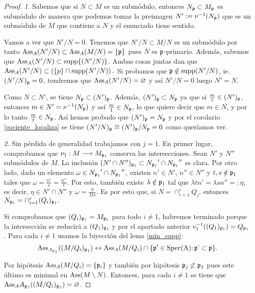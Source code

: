 \documentclass[../main.tex]{subfiles}
\begin{document}
\begin{proof}
\textit{1.} Sabemos que si $N\subset M$ es un submódulo, entonces $N_{\mathfrak{p}}\subset M_{\mathfrak{p}}$ es submódulo de manera que podemos tomar la preimagen $N':=\nu^{-1}(N_{\mathfrak{p}})$ que es un submódulo de $M$ que contiene a $N$ y el enunciado tiene sentido.

Vamos a ver que $N'/N = 0$. Tenemos que $N'/N\subset M/N$ es un submódulo por tanto $\text{Ass}_A(N'/N)\subset\text{Ass}_A(M/N)=\{\mathfrak{p}\}$ pues $N$ es $\mathfrak{p}$-primario. Además, sabemos que $\text{Ass}_A(N'/N)\subset\operatorname{supp}\{(N'/N)\}$.
Ambas cosas juntas dan que $\text{Ass}_A(N'/N) \subset \left ( \{p\}\cap\operatorname{supp}(N'/N) \right).$ Si probamos que $\mathfrak{p}\notin\operatorname{supp}(N'/N)$, ie. $(N'/N)_{\mathfrak{p}} = 0$, tendremos que $\text{Ass}_A(N'/N)=\varnothing$ y así $N'/N=0$ luego $N' = N$.

Como $N \subset N'$, se tiene $N_{\mathfrak{p}} \subset (N')_{\mathfrak{p}}$. Además, $(N')_{\mathfrak{p}} \subset N_{\mathfrak{p}}$ ya que si $\frac{m}{t}\in (N')_{\mathfrak{p}}$,
entonces $m \in N' = \nu ^{-1} (N_{\mathfrak{p}})$ y así $\frac{m}{1} \in N_{\mathfrak{p}}$, lo que quiere decir que $m \in N$, y por lo tanto $\frac{m}{t} \in N_{\mathfrak{p}}$. Así hemos probado que $(N')_{\mathfrak{p}} = N_{\mathfrak{p}}$ y por el corolario \ref{cociente_localiza} se tiene $(N'/N)_{\mathfrak{p}} \cong (N')_{\mathfrak{p}} / N_{\mathfrak{p}} = 0$ como queríamos ver.

\textit{2.} Sin pérdida de generalidad trabajamos con $j=1$. En primer lugar, comprobamos que $\nu_1:M\longrightarrow M_{\mathfrak{p}_1}$ conserva las intersecciones. Sean $N'$ y $N''$ submódulos de $M$. La inclusión $(N'\cap N'')_{\mathfrak{p}_1}\subset {N_{\mathfrak{p}_1}}'\cap{N_{\mathfrak{p}_1}}''$ es clara. Por otro lado, dado un elemento $\omega\in {N_{\mathfrak{p}_1}}'\cap{N_{\mathfrak{p}_1}}''$, existen $n'\in N'$, $n''\in N''$ y $t,s\notin\mathfrak{p}_1$ tales que $\omega=\frac{n'}{s}=\frac{n''}{t}.$ Por esto, también existe $\lambda\notin\mathfrak{p}_1$ tal que $\lambda tn'=\lambda sn''=:\eta$; es decir, $\eta\in N'\cap N''$ y $\omega=\frac{\eta}{\lambda ts}.$ Es por esto que, si $N=\cap_{i=1}^r Q_i$, entonces $N_{\mathfrak{p}_1}=\cap_{i=1}^r(Q_i)_{\mathfrak{p}_1}.$

Si comprobamos que $(Q_i)_{\mathfrak{p}_1}=M_{\mathfrak{p}_1}$ para todo $i\neq 1$, habremos terminado porque la intersección se reducirá a $(Q_1)_{\mathfrak{p}_1}$ y por el apartado anterior $v_1^{-1}((Q_1)_{\mathfrak{p}_1}) = Q_{\mathfrak{p}_1}$.
Para cada $i\neq 1$ usamos la biyección del lema \ref{min_supp}:
$$\text{Ass}_{A_{\mathfrak{p}_1}}((M/Q_i)_{\mathfrak{p}_1})\leftrightarrow\text{Ass}_A(M/Q_i)\cap\{\mathfrak{p}'\in\operatorname{Spec(A):\mathfrak{p}'\subset\mathfrak{p}}\}.$$

Por hipótesis $\text{Ass}_A(M/Q_i)=\{\mathfrak{p}_i\}$ y también por hipótesis $\mathfrak{p}_j\not\subset\mathfrak{p}_1$ pues este último es minimal en $\text{Ass}(M\setminus N)$. Entonces, para cada $i\neq 1$ se tiene que  $\text{Ass}_A{A_{\mathfrak{p}_1}}((M/Q_i)_{\mathfrak{p}_1})=\varnothing$.
\end{proof}
\end{document}
